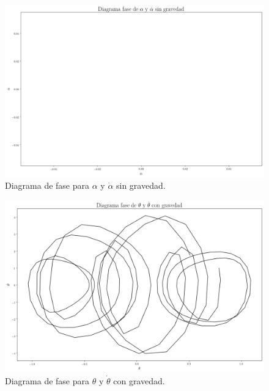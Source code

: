 \documentclass[12pt,letterpaper]{article}
\begin{document}
\begin{figure}[h]
 \centering
 \includegraphics[scale=0.2]{img/dp_phase_alpha_dalpha.png}
 \caption{Diagrama de fase para $\alpha$ y $\dot{\alpha}$ sin gravedad.}
 \label{fig: dp phase alpha dalpha}
\end{figure}

\begin{figure}[h]
 \centering
 \includegraphics[scale=0.2]{img/dp_phase_theta_dtheta_G.png}
 \caption{Diagrama de fase para $\theta$ y $\dot{\theta}$ con gravedad.}
 \label{fig: dp phase theta dtheta G}
\end{figure}
\end{document}
